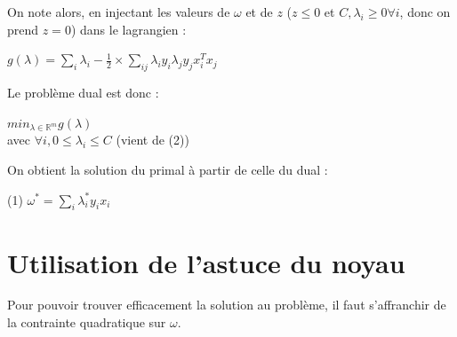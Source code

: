 \documentclass{article}
\begin{document}
On note alors, en injectant les valeurs de $\omega$ et de $z$ ($z \leq 0$ et $C, \lambda_i \geq 0 \forall i$, donc on prend $z=0$) dans le lagrangien :\\

              \begin{center}
              $g(\lambda) = \sum_i \lambda_i -\frac{1}{2} \times \sum_{ij} \lambda_i y_i \lambda_j y_j x_i^{T} x_j$
              \end{center}

Le problème dual est donc :\\

             \begin{center}
             $min_{\lambda \in \mathbb{R}^{m}} g(\lambda)$\\ 
             avec $\forall i, 0 \leq \lambda_i \leq C$ (vient de (2))\\
             \end{center}

On obtient la solution du primal à partir de celle du dual :

             \begin{center}
             (1) $\omega^{*} = \sum_i \lambda^{*}_i y_i x_i$
             \end{center}

\section{Utilisation de l'astuce du noyau}

Pour pouvoir trouver efficacement la solution au problème, il faut s'affranchir de la contrainte quadratique sur $\omega$.\\
\end{document}
